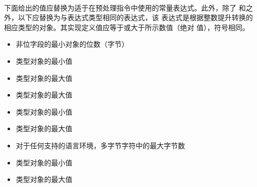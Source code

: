 
\paragraph{}
下面给出的值应替换为适于在预处理指令中使用的常量表达式。此外，除了
和之外，以下应替换为与表达式类型相同的表达式，该
表达式是根据整数提升转换的相应类型的对象。其实现定义值应等于或大于所示数值（绝对
值），符号相同。
\begin{itemize}
  \item{非位字段的最小对象的位数（字节）
    \begin{itemize}
    \end{itemize}}
  \item{类型对象的最小值
    \begin{itemize}
    \end{itemize}}
  \item{类型对象的最大值
    \begin{itemize}
    \end{itemize}}
  \item{类型对象的最大值
    \begin{itemize}
    \end{itemize}}
  \item{类型对象的最小值
    \begin{itemize}
    \end{itemize}}
  \item{类型对象的最大值
    \begin{itemize}
    \end{itemize}}
  \item{对于任何支持的语言环境，多字节字符中的最大字节数
    \begin{itemize}
    \end{itemize}}
  \item{类型对象的最小值
    \begin{itemize}
    \end{itemize}}
  \item{类型对象的最大值
    \begin{itemize}

\end{itemize}}
\end{itemize}

